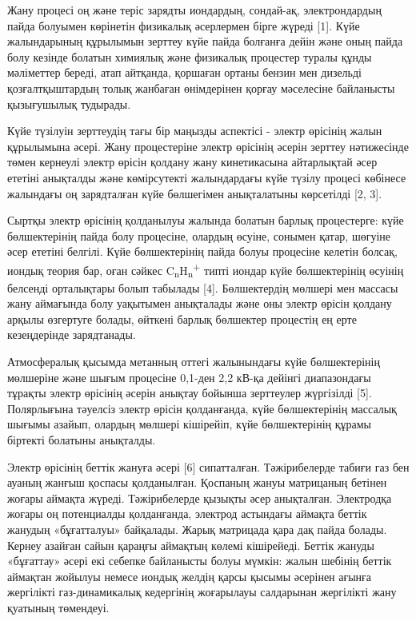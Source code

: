 Жану процесі оң және теріс зарядты иондардың, сондай-ақ, электрондардың
пайда болуымен көрінетін физикалық әсерлермен бірге жүреді {[}1{]}. Күйе
жалындарының құрылымын зерттеу күйе пайда болғанға дейін және оның пайда
болу кезінде болатын химиялық және физикалық процестер туралы құнды
мәліметтер береді, атап айтқанда, қоршаған ортаны бензин мен дизельді
қозғалтқыштардың толық жанбаған өнімдерінен қорғау мәселесіне байланысты
қызығушылық тудырады.

Күйе түзілуін зерттеудің тағы бір маңызды аспектісі - электр өрісінің
жалын құрылымына әсері. Жану процестеріне электр өрісінің әсерін зерттеу
нәтижесінде төмен кернеулі электр өрісін қолдану жану кинетикасына
айтарлықтай әсер ететіні анықталды және көмірсутекті жалындардағы күйе
түзілу процесі көбінесе жалындағы оң зарядталған күйе бөлшегімен
анықталатыны көрсетілді {[}2, 3{]}.

Сыртқы электр өрісінің қолданылуы жалында болатын барлық процестерге:
күйе бөлшектерінің пайда болу процесіне, олардың өсуіне, сонымен қатар,
шөгуіне әсер ететіні белгілі. Күйе бөлшектерінің пайда болуы процесіне
келетін болсақ, иондық теория бар, оған сәйкес
C\textsubscript{n}H\textsubscript{n}\textsuperscript{+} типті иондар
күйе бөлшектерінің өсуінің белсенді орталықтары болып табылады {[}4{]}.
Бөлшектердің мөлшері мен массасы жану аймағында болу уақытымен
анықталады және оны электр өрісін қолдану арқылы өзгертуге болады,
өйткені барлық бөлшектер процестің ең ерте кезеңдерінде зарядтанады.

Атмосфералық қысымда метанның оттегі жалынындағы күйе бөлшектерінің
мөлшеріне және шығым процесіне 0,1-ден 2,2 кВ-қа дейінгі диапазондағы
тұрақты электр өрісінің әсерін анықтау бойынша зерттеулер жүргізілді
{[}5{]}. Полярлығына тәуелсіз электр өрісін қолданғанда, күйе
бөлшектерінің массалық шығымы азайып, олардың мөлшері кішірейіп, күйе
бөлшектерінің құрамы біртекті болатыны анықталды.

Электр өрісінің беттік жануға әсері {[}6{]} сипатталған. Тәжірибелерде
табиғи газ бен ауаның жанғыш қоспасы қолданылған. Қоспаның жануы
матрицаның бетінен жоғары аймақта жүреді. Тәжірибелерде қызықты әсер
анықталған. Электродқа жоғары оң потенциалды қолданғанда, электрод
астындағы аймақта беттік жанудың «бұғатталуы» байқалады. Жарық матрицада
қара дақ пайда болады. Кернеу азайған сайын қараңғы аймақтың көлемі
кішірейеді. Беттік жануды «бұғаттау» әсері екі себепке байланысты болуы
мүмкін: жалын шебінің беттік аймақтан жойылуы немесе иондық желдің қарсы
қысымы әсерінен ағынға жергілікті газ-динамикалық кедергінің жоғарылауы
салдарынан жергілікті жану қуатының төмендеуі.

